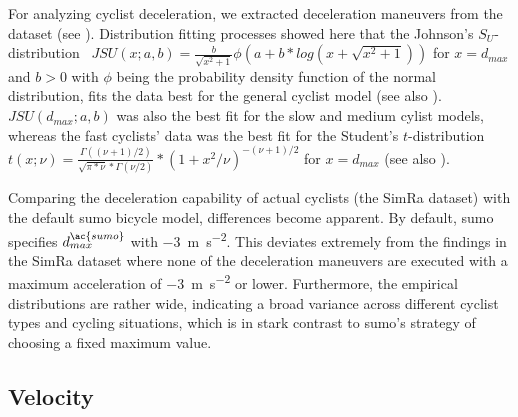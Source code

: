 For analyzing cyclist deceleration, we extracted deceleration maneuvers from the dataset (see ).
Distribution fitting processes showed here that the Johnson's $S_{U}$-distribution~\cite{johnson1949systems} $JSU(x; a,b) = \frac{b}{\sqrt{x^2+1}}\phi(a+b*log(x+\sqrt{x^2+1}))$ for $x=d_{max}$ and $b>0$ with $\phi$ being the probability density function of the normal distribution, fits the data best for the general cyclist model (see also ).
$JSU(d_{max}; a,b)$ was also the best fit for the slow and medium cylist models, whereas the fast cyclists' data was the best fit for the Student's $t$-distribution~\cite{student1908probable} $t(x; \nu)=\frac{\Gamma((\nu+1)/2)}{\sqrt{\pi*\nu}*\Gamma(\nu/2)}*(1+x^2/\nu)^{-(\nu+1)/2}$ for $x=d_{max}$ (see also ).

Comparing the deceleration capability of actual cyclists (the SimRa dataset) with the default \ac{sumo} bicycle model, differences become apparent.
By default, \ac{sumo} specifies $d_{max}^{\ac{sumo}}$ with \SI{-3}{\metre\per\square\second}.
This deviates extremely from the findings in the SimRa dataset where none of the deceleration maneuvers are executed with a maximum acceleration of \SI{-3}{\metre\per\square\second} or lower.
Furthermore, the empirical distributions are rather wide, indicating a broad variance across different cyclist types and cycling situations, which is in stark contrast to \ac{sumo}'s strategy of choosing a fixed maximum value.

\subsection{Velocity}
\label{subsec:velocity_preprocessing}
                                                                        
